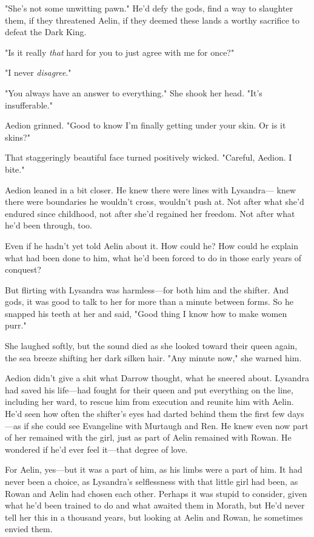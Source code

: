 "She's not some unwitting pawn." He'd defy the gods, find a way to slaughter them, if they threatened Aelin, if they deemed these lands a worthy sacrifice to defeat the Dark King.

"Is it really \emph{that} hard for you to just agree with me for once?"

"I never \emph{disagree}."

"You always have an answer to everything." She shook her head. "It's insufferable."

Aedion grinned. "Good to know I'm finally getting under your skin. Or is it skins?"

That staggeringly beautiful face turned positively wicked. "Careful, Aedion. I bite."

Aedion leaned in a bit closer. He knew there were lines with Lysandra--- knew there were boundaries he wouldn't cross, wouldn't push at. Not after what she'd endured since childhood, not after she'd regained her freedom. Not after what he'd been through, too.

Even if he hadn't yet told Aelin about it. How could he? How could he explain what had been done to him, what he'd been forced to do in those early years of conquest?

But flirting with Lysandra was harmless---for both him and the shifter. And gods, it was good to talk to her for more than a minute between forms. So he snapped his teeth at her and said, "Good thing I know how to make women purr."

She laughed softly, but the sound died as she looked toward their queen again, the sea breeze shifting her dark silken hair. "Any minute now," she warned him.

Aedion didn't give a shit what Darrow thought, what he sneered about. Lysandra had saved his life---had fought for their queen and put everything on the line, including her ward, to rescue him from execution and reunite him with Aelin. He'd seen how often the shifter's eyes had darted behind them the first few days---as if she could see Evangeline with Murtaugh and Ren. He knew even now part of her remained with the girl, just as part of Aelin remained with Rowan. He wondered if he'd ever feel it---that degree of love.

For Aelin, yes---but  it was a part of him, as his limbs were a part of him. It had never been a choice, as Lysandra's selflessness with that little girl had been, as Rowan and Aelin had chosen each other. Perhaps it was stupid to consider, given what he'd been trained to do and what awaited them in Morath, but  He'd never tell her this in a thousand years, but looking at Aelin and Rowan, he sometimes envied them.

